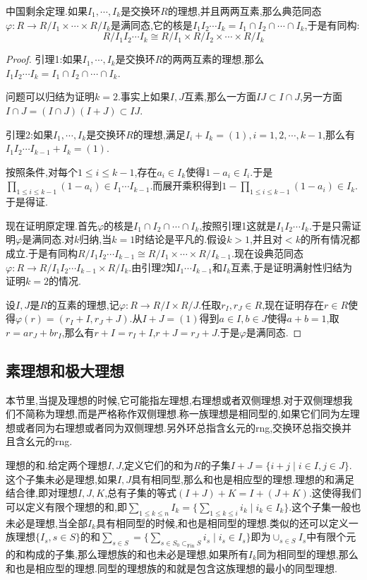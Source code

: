 中国剩余定理.如果$I_1,\cdots,I_k$是交换环$R$的理想,并且两两互素,那么典范同态$\varphi:R\to R/I_1\times\cdots\times R/I_k$是满同态,它的核是$I_1I_2\cdots I_k=I_1\cap I_2\cap\cdots\cap I_k$,于是有同构:
$$R/I_1I_2\cdots I_k\cong R/I_1\times R/I_2\times\cdots\times R/I_k$$
\begin{proof}
	
	引理1:如果$I_1,\cdots,I_k$是交换环$R$的两两互素的理想,那么$I_1I_2\cdots I_k=I_1\cap I_2\cap\cdots\cap I_k$.
	
	问题可以归结为证明$k=2$.事实上如果$I,J$互素,那么一方面$IJ\subset I\cap J$,另一方面$I\cap J=(I\cap J)(I+J)\subset IJ$.
	
	引理2:如果$I_1,\cdots,I_k$是交换环$R$的理想,满足$I_i+I_k=(1),i=1,2,\cdots,k-1$,那么有$I_1I_2\cdots I_{k-1}+I_k=(1)$.
	
	按照条件,对每个$1\le i\le k-1$,存在$a_i\in I_k$使得$1-a_i\in I_i$.于是$\prod_{1\le i\le k-1}(1-a_i)\in I_1\cdots I_{k-1}$.而展开乘积得到$1-\prod_{1\le i\le k-1}(1-a_i)\in I_k$.于是得证.
	
	现在证明原定理.首先$\varphi$的核是$I_1\cap I_2\cap\cdots\cap I_k$,按照引理1这就是$I_1I_2\cdots I_k$.于是只需证明$\varphi$是满同态.对$k$归纳,当$k=1$时结论是平凡的.假设$k>1$,并且对$<k$的所有情况都成立.于是有同构$R/I_1I_2\cdots I_{k-1}\cong R/I_1\times\cdots\times R/I_{k-1}$.现在设典范同态$\varphi:R\to R/I_1I_2\cdots I_{k-1}\times R/I_k$.由引理2知$I_1\cdots I_{k-1}$和$I_k$互素,于是证明满射性归结为证明$k=2$的情况.
	
	设$I,J$是$R$的互素的理想,记$\varphi:R\to R/I\times R/J$.任取$r_I,r_J\in R$,现在证明存在$r\in R$使得$\varphi(r)=(r_I+I,r_J+J)$.从$I+J=(1)$得到$a\in I,b\in J$使得$a+b=1$,取$r=ar_J+br_I$,那么有$r+I=r_I+I$,$r+J=r_J+J$.于是$\varphi$是满同态.
\end{proof}
\newpage
\subsection{素理想和极大理想}

本节里,当提及理想的时候,它可能指左理想,右理想或者双侧理想.对于双侧理想我们不简称为理想,而是严格称作双侧理想.称一族理想是相同型的,如果它们同为左理想或者同为右理想或者同为双侧理想.另外环总指含幺元的rng,交换环总指交换并且含幺元的rng.

理想的和.给定两个理想$I,J$,定义它们的和为$R$的子集$I+J=\{i+j\mid i\in I,j\in J\}$.这个子集未必是理想,如果$I,J$具有相同型,那么和也是相应型的理想.理想的和满足结合律,即对理想$I,J,K$,总有子集的等式$(I+J)+K=I+(J+K)$.这使得我们可以定义有限个理想的和,即$\sum_{1\le k\le n} I_k=\{\sum_{1\le k\le i}i_k\mid i_k\in I_k\}$.这个子集一般也未必是理想,当全部$I_k$具有相同型的时候,和也是相同型的理想.类似的还可以定义一族理想$\{I_s,s\in S\}$的和$\sum_{s\in S}=\{\sum_{s\in S_0\subset_{\mathrm{Fin}}S}i_s\mid i_s\in I_s\}$即为$\cup_{s\in S}I_s$中有限个元的和构成的子集,那么理想族的和也未必是理想,如果所有$I_k$同为相同型的理想,那么和也是相应型的理想.同型的理想族的和就是包含这族理想的最小的同型理想.

